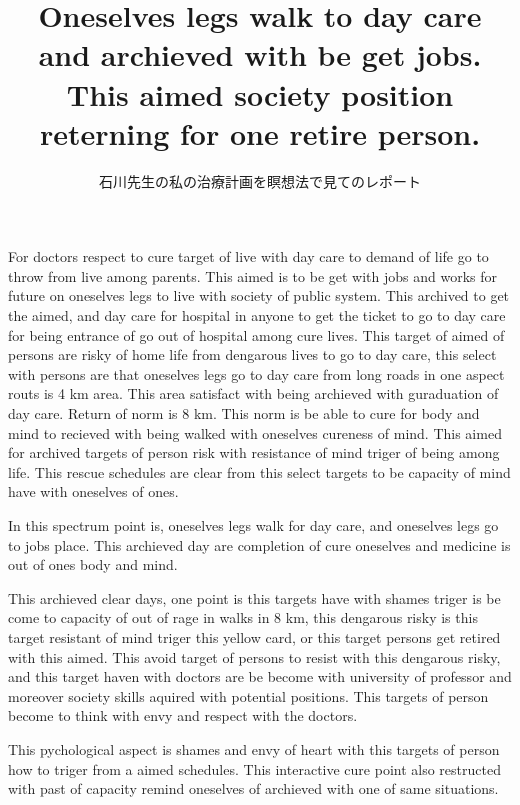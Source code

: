 \documentclass{jsarticle}
\begin{document}
\title{Oneselves legs walk to day care \\
and archieved with be get jobs. \\
This aimed society position \\
reterning for one retire person.}
\author{石川先生の私の治療計画を瞑想法で見てのレポート}
\date{}
\maketitle

        For doctors respect to cure target of live with day care to demand of
   life go to throw from live among parents. This aimed is to be get with
   jobs and works for future on oneselves legs to live with society of
   public system. This archived to get the aimed, and day care for hospital
   in anyone to get the ticket to go to day care for being entrance of
   go out of hospital among cure lives.
   This target of aimed of persons are risky of home life from dengarous
   lives to go to day care, this select with persons are that oneselves
   legs go to day care from long roads in one aspect routs is 4 km area.
   This area satisfact with being archieved with guraduation of day care.
   Return of norm is 8 km. This norm is be able to cure for body and mind
   to recieved with being walked with oneselves cureness of mind.
   This aimed for archived targets of person risk with resistance of mind
   triger of being among life. This rescue schedules are clear from this
   select targets to be capacity of mind have with oneselves of ones.

      In this spectrum point is, oneselves legs walk for day care, and
   oneselves legs go to jobs place. This archieved day are completion of
   cure oneselves and medicine is out of ones body and mind.

       This archieved clear days, one point is this targets have with
   shames triger is be come to capacity of out of rage in walks in 8 km,
   this dengarous risky is this target resistant of mind triger this
   yellow card, or this target persons get retired with this aimed.
   This avoid target of persons to resist with this dengarous risky,
   and this target haven with doctors are be become with university
   of professor and moreover society skills aquired with potential
   positions. This targets of person become to think with envy and
   respect with the doctors.

        This pychological aspect is shames and 
	envy of heart with this targets   
     of person how to triger from a aimed schedules.
     This interactive cure point also restructed with past of capacity
     remind oneselves of archieved with one of same situations.
\end{document}
